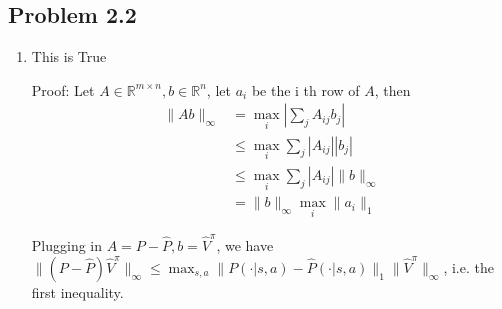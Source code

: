 \documentclass[10pt]{report}
\begin{document}
\subsection*{Problem 2.2}
\begin{enumerate}
	\item 
	This is True

	Proof: Let $A \in \mathbb{R}^{m \times n}, b \in \mathbb{R}^n$, let $a_i$ be the i th row of $A$, then
	\begin{align*}
		\lVert Ab \rVert_\infty &= \max_{i} |\sum_{j} A_{ij} b_j| \\
		&\leq \max_i \sum_j |A_{ij}| |b_j| \\
		&\leq \max_i \sum_j |A_{ij}| \lVert b \rVert_\infty \\
		&= \lVert b \rVert_\infty \max_i \lVert a_i \rVert_1
	\end{align*}

	Plugging in $A = P - \widehat{P}, b = \widehat{V}^\pi$, we have $\lVert (P - \widehat{P}) \widehat{V}^\pi \rVert_\infty \leq \max_{s, a} \lVert P(\cdot | s, a) - \widehat{P}(\cdot | s, a)\rVert_1 \lVert \widehat{V}^\pi \rVert_\infty$, i.e. the first inequality. 


\end{enumerate}
\end{document}
